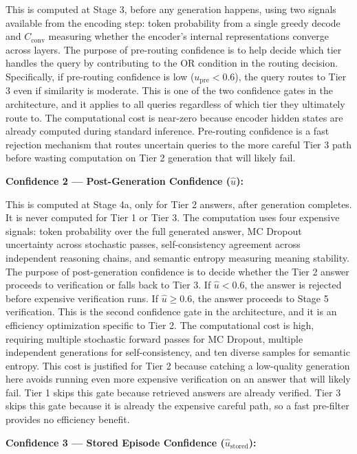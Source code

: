 \documentclass[11pt,a4paper]{article}
\newcommand{\Cconv}{C_{\text{conv}}}
\newcommand{\uhat}{\hat{u}}
\newcommand{\upre}{u_{\text{pre}}}
\newcommand{\ustored}{\hat{u}_{\text{stored}}}
\begin{document}
This is computed at Stage 3, before any generation happens, using two signals available from the encoding step: token probability from a single greedy decode and $\Cconv$ measuring whether the encoder's internal representations converge across layers. The purpose of pre-routing confidence is to help decide which tier handles the query by contributing to the OR condition in the routing decision. Specifically, if pre-routing confidence is low ($\upre < 0.6$), the query routes to Tier 3 even if similarity is moderate. This is one of the two confidence gates in the architecture, and it applies to all queries regardless of which tier they ultimately route to. The computational cost is near-zero because encoder hidden states are already computed during standard inference. Pre-routing confidence is a fast rejection mechanism that routes uncertain queries to the more careful Tier 3 path before wasting computation on Tier 2 generation that will likely fail.

\textbf{Confidence 2 — Post-Generation Confidence ($\uhat$):}

This is computed at Stage 4a, only for Tier 2 answers, after generation completes. It is never computed for Tier 1 or Tier 3. The computation uses four expensive signals: token probability over the full generated answer, MC Dropout uncertainty across stochastic passes, self-consistency agreement across independent reasoning chains, and semantic entropy measuring meaning stability. The purpose of post-generation confidence is to decide whether the Tier 2 answer proceeds to verification or falls back to Tier 3. If $\uhat < 0.6$, the answer is rejected before expensive verification runs. If $\uhat \geq 0.6$, the answer proceeds to Stage 5 verification. This is the second confidence gate in the architecture, and it is an efficiency optimization specific to Tier 2. The computational cost is high, requiring multiple stochastic forward passes for MC Dropout, multiple independent generations for self-consistency, and ten diverse samples for semantic entropy. This cost is justified for Tier 2 because catching a low-quality generation here avoids running even more expensive verification on an answer that will likely fail. Tier 1 skips this gate because retrieved answers are already verified. Tier 3 skips this gate because it is already the expensive careful path, so a fast pre-filter provides no efficiency benefit.

\textbf{Confidence 3 — Stored Episode Confidence ($\ustored$):}
\end{document}
